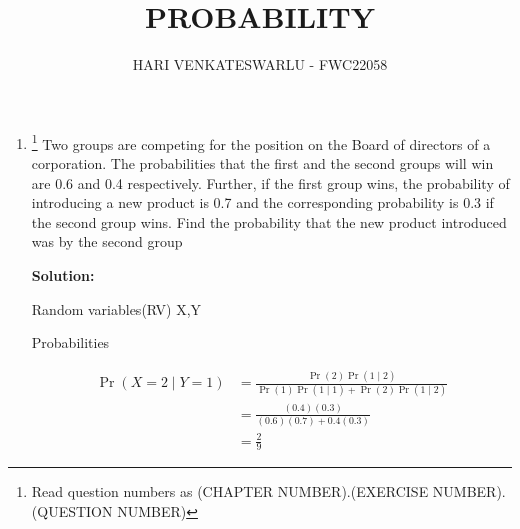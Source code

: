\documentclass{article}
\providecommand{\pr}[1]{\ensuremath{\Pr\left(#1\right)}}
\newcommand{\solution}{\noindent \textbf{Solution: }}
\providecommand{\pr}[1]{\ensuremath{\Pr\left(#1\right)}}
\begin{document}
\title{PROBABILITY}
\author{\Large HARI VENKATESWARLU - FWC22058}
\date{}

\maketitle

\begin{enumerate}[label=13.\arabic{enumi}.\arabic{enumii}]%
\setcounter{enumi}{0}
\setcounter{enumii}{11}

\item \footnote{Read question numbers as (CHAPTER NUMBER).(EXERCISE NUMBER).(QUESTION NUMBER)} {Two groups are competing for the position
on the Board of directors of a corporation.
The probabilities that the first and the second
groups will win are 0.6 and 0.4 respectively.
Further, if the first group wins, the probability
of introducing a new product is 0.7 and the
corresponding probability is 0.3 if the second
group wins. Find the probability that the new
product introduced was by the second group}

	\solution\\
	\begin{table}[h]\centering
	
	\caption{Random variables(RV) X,Y}
	\label{table1:}
\end{table}

    \begin{table}[h]\centering
	
	\caption{Probabilities}
	\label{table2:}
    \end{table}
\begin{align}
\pr{X=2 \mid Y=1} &= \frac{\pr{2}\pr{1 \mid 2}}{\pr{1}\pr{1 \mid 1}+\pr{2}\pr{1 \mid 2}}\\
&=\frac{(0.4)(0.3)}{(0.6)(0.7)+0.4(0.3)}\\
&=\frac{2}{9}
\end{align}
\end{enumerate}
\end{document}
